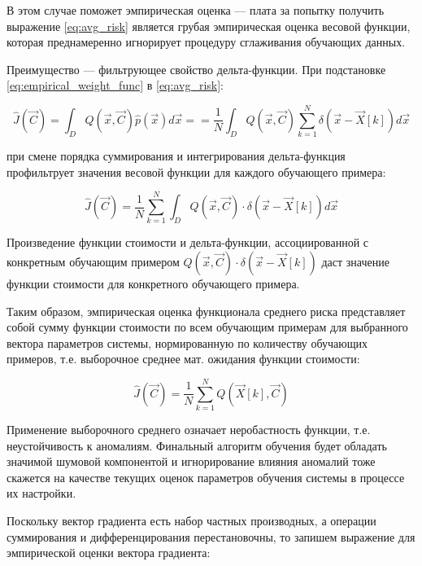 \documentclass{article}
\numberwithin{equation}{subsection}
\begin{document}
В этом случае поможет эмпирическая оценка --- плата за попытку 
получить выражение \ref{eq:avg_risk} является грубая эмпирическая 
оценка весовой функции, которая преднамеренно игнорирует процедуру
сглаживания обучающих данных.

Преимущество --- фильтрующее свойство дельта-функции. При подстановке \ref{eq:empirical_weight_func}
в \ref{eq:avg_risk}:

\begin{equation}
    \hat{J}(\vec{C}) = \int_{D} Q(\vec{x}, \vec{C}) \hat{p}(\vec{x}) d\vec{x} =
    = \dfrac{1}{N} \int_{D} Q(\vec{x}, \vec{C}) \sum_{k=1}^{N} \delta(\vec{x} - 
    \vec{X}[k]) d\vec{x}
\end{equation}

\noindent
при смене порядка суммирования и интегрирования дельта-функция \glqq профильтрует \grqq
значения весовой функции для каждого обучающего примера:

\begin{equation}
    \hat{J}(\vec{C}) = \dfrac{1}{N} \sum_{k=1}^{N} \int_{D} 
    Q(\vec{x}, \vec{C}) \cdot \delta(\vec{x} - \vec{X}[k]) d\vec{x}
\end{equation}

Произведение функции стоимости и дельта-функции, ассоциированной с конкретным обучающим
примером $Q(\vec{x}, \vec{C}) \cdot \delta(\vec{x} - \vec{X}[k])$ даст значение функции
стоимости для конкретного обучающего примера.

Таким образом, эмпирическая оценка функционала среднего риска представляет собой сумму
функции стоимости по всем обучающим примерам для выбранного вектора параметров системы,
нормированную по количеству обучающих примеров, т.е. выборочное среднее мат. ожидания
функции стоимости:

\begin{equation}
    \hat{J}(\vec{C}) = \dfrac{1}{N} \sum_{k=1}^{N} Q(\vec{X}[k], \vec{C})
\end{equation}

Применение выборочного среднего означает неробастность функции, т.е. неустойчивость
к аномалиям. Финальный алгоритм обучения будет обладать значимой шумовой компонентой 
и игнорирование влияния аномалий тоже скажется на качестве текущих оценок параметров 
обучения системы в процессе их настройки.

Поскольку вектор градиента есть набор частных производных, а операции суммирования 
и дифференцирования перестановочны, то запишем выражение для эмпирической оценки вектора
градиента:
\end{document}
